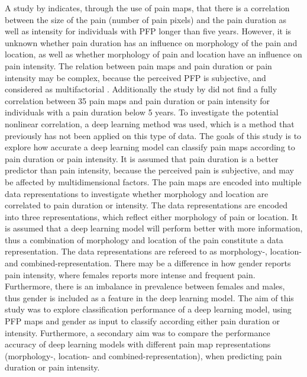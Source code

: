 \noindent
A study by \citeauthor{Boudreau2017} \citep{Boudreau2017} indicates, through the use of pain maps, that there is a correlation between the size of the pain (number of pain pixels) and the pain duration as well as intensity for individuals with PFP longer than five years.\citep{Boudreau2017}
However, it is unknown whether pain duration has an influence on morphology of the pain and location, as well as  whether morphology of pain and location have an influence on pain intensity.
The relation between pain maps and pain duration or pain intensity may be complex, because the perceived PFP is subjective, and considered as multifactorial \citep{Dansie2013}. Additionally the study by \citeauthor{Boudreau2017} did not find a fully correlation between 35 pain maps and pain duration or pain intensity for individuals with a pain duration below 5 years. To investigate the potential nonlinear correlation, a deep learning method was used, which is a method that previously has not been applied on this type of data. \newline
\noindent
The goals of this study is to explore how accurate a deep learning model can classify pain maps according to pain duration or pain intensity. It is assumed that pain duration is a better predictor than pain intensity, because the perceived pain is subjective, and may be affected by multidimensional factors. 
The pain maps are encoded into multiple data representations to investigate whether morphology and location are correlated to pain duration or intensity.\newline
\noindent
The data representations are encoded into three representations, which reflect either morphology of pain or location. It is assumed that a deep learning model will perform better with more information, thus a combination of morphology and location of the pain constitute a data representation.  The data representations are refereed to as morphology-, location- and combined-representation.
There may be a difference in how gender reports pain intensity, where females reports more intense and frequent pain. Furthermore, there is an imbalance in prevalence between females and males, thus gender is included as a feature in the deep learning model. \newline
\noindent
The aim of this study was to explore classification performance of a deep learning model, using PFP maps and gender as input to classify according either pain duration or intensity.
Furthermore, a secondary aim was to compare the performance accuracy of deep learning models with different pain map representations (morphology-, location- and combined-representation), when predicting pain duration or pain intensity. 
